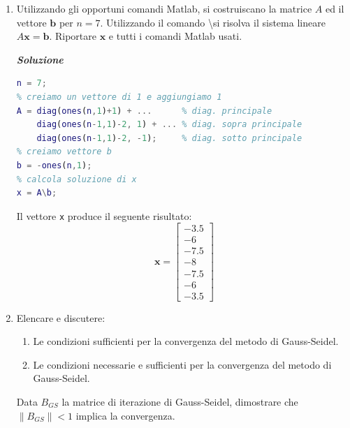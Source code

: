 \begin{enumerate}
    \item Utilizzando gli opportuni comandi Matlab, si costruiscano la matrice $A$ ed il vettore $\mathbf{b}$ per $n = 7$. Utilizzando il comando \textbackslash si risolva il sistema lineare $A\mathbf{x} = \mathbf{b}$. Riportare $\mathbf{x}$ e tutti i comandi Matlab usati.
    
    \textcolor{Green3}{\textbf{\emph{Soluzione}}}
    \begin{lstlisting}[language=MATLAB]
% dimensione di n
n = 7;
% creiamo un vettore di 1 e aggiungiamo 1
A = diag(ones(n,1)+1) + ...      % diag. principale
    diag(ones(n-1,1)-2, 1) + ... % diag. sopra principale
    diag(ones(n-1,1)-2, -1);     % diag. sotto principale
% creiamo vettore b
b = -ones(n,1);
% calcola soluzione di x
x = A\b;\end{lstlisting}
Il vettore \texttt{x} produce il seguente risultato:
\begin{equation*}
    \mathbf{x} = \begin{bmatrix}
        -3.5 \\
        -6 \\
        -7.5 \\
        -8 \\
        -7.5 \\
        -6 \\
        -3.5
    \end{bmatrix}
\end{equation*}

    \item Elencare e discutere:
    \begin{enumerate}
        \item Le condizioni sufficienti per la convergenza del metodo di Gauss-Seidel.
        \item Le condizioni necessarie e sufficienti per la convergenza del metodo di Gauss-Seidel.
    \end{enumerate}
    Data $B_{GS}$ la matrice di iterazione di Gauss-Seidel, dimostrare che\break $\left\| B_{GS} \right\| < 1$ implica la convergenza.


\end{enumerate}
